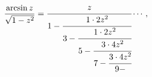 \[\frac{\mathop{\mathrm{arcsin}\/}\nolimits z}{\sqrt{1-z^{2}}}=\cfrac{z}{1-%
\cfrac{1\cdot 2z^{2}}{3-\cfrac{1\cdot 2z^{2}}{5-\cfrac{3\cdot 4z^{2}}{7-\cfrac%
{3\cdot 4z^{2}}{9-}}}}}\cdots,\]